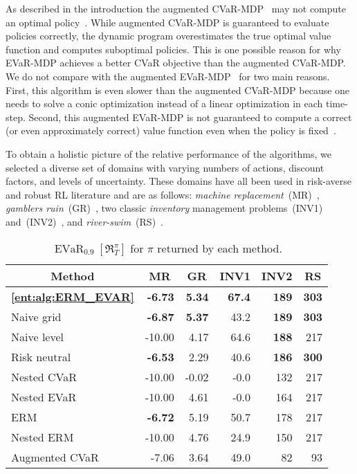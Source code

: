 \documentclass[twoside]{article}
\newcommand{\evar}[2]{\operatorname{EVaR}_{#1} \left[#2\right]}
\theoremstyle{plain}
\theoremstyle{definition}
\theoremstyle{remark}
\renewcommand{\cite}[1]{\citep{#1}}
\begin{document}
As described in the introduction the augmented CVaR-MDP~\cite{Chow2015} may not compute an optimal policy~\cite{Hau2023a}. While augmented CVaR-MDP is guaranteed to evaluate policies correctly, the dynamic program overestimates the true optimal value function and computes suboptimal policies. This is one possible reason for why EVaR-MDP achieves a better CVaR objective than the augmented CVaR-MDP. We do not compare with the augmented EVaR-MDP~\cite{Ni2022,Ni2022a} for two main reasons. First, this algorithm is even slower than the augmented CVaR-MDP because one needs to solve a conic optimization instead of a linear optimization in each time-step. Second, this augmented EVaR-MDP is not guaranteed to compute a correct (or even approximately correct) value function even when the policy is fixed~\cite{Hau2023a}.

To obtain a holistic picture of the relative performance of the algorithms, we selected a diverse set of domains with varying numbers of actions, discount factors, and levels of uncertainty. These domains have all been used in risk-averse and robust RL literature and are as follows: \emph{machine replacement}~(MR)~\cite{Delage2009}, \emph{gamblers ruin}~(GR)~\cite{Bauerle2011,Li2022}, two classic \emph{inventory} management problems~(INV1) and~(INV2)~\cite{Ho2021a}, and  \emph{river-swim}~(RS)~\cite{Strehl2008model}. 

\begin{table}
\caption{$\evar{0.9}{\mathfrak{R}^{\pi}_{T}}$ for $\pi$ returned by each method.} \label{ent:tab:evar_09}
\centering
\begin{small}
\begin{tabular}{l|rrrrr}
\toprule
\multicolumn{1}{c|}{Method} & \multicolumn{1}{c}{MR} & \multicolumn{1}{c}{GR} & \multicolumn{1}{c}{INV1} & \multicolumn{1}{c}{INV2} & \multicolumn{1}{c}{RS}  \\
  \midrule
  \textbf{\cref{ent:alg:ERM_EVAR}} & \textbf{-6.73} & \textbf{5.34} & \textbf{67.4} & \textbf{189} & \textbf{303} \\ 
  Naive grid & \textbf{-6.87} & \textbf{5.37} & 43.2 & \textbf{189} & \textbf{303} \\ 
  Naive level & -10.00 & 4.17 & 64.6 & \textbf{188} & 217 \\ 
  \midrule
   Risk neutral & \textbf{-6.53} & 2.29 & 40.6 & \textbf{186} & \textbf{300} \\
   Nested CVaR & -10.00 & -0.02 & -0.0 & 132 & 217 \\ 
   Nested EVaR & -10.00 & 4.61 & -0.0 & 164 & 217 \\ 
   ERM & \textbf{-6.72} & 5.19 & 50.7 & 178 & 217 \\ 
   Nested ERM & -10.00 & 4.76 & 24.9 & 150 & 217 \\ 
  \midrule
   Augmented CVaR & -7.06 & 3.64 & 49.0 & 82 & 93 \\
  \bottomrule
\end{tabular}
\end{small}
\end{table}
\end{document}
